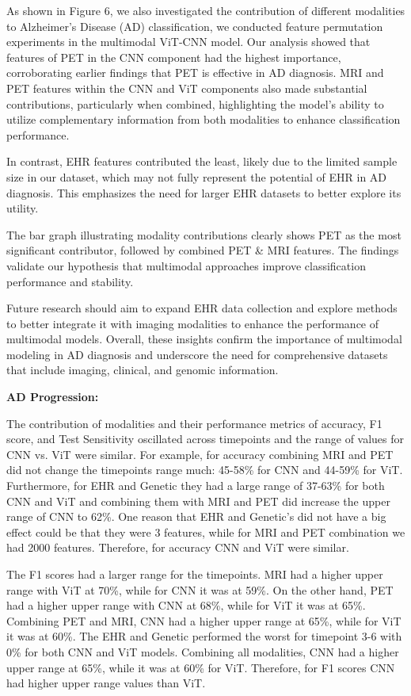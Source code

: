 As shown in Figure 6, we also investigated the contribution of different modalities to Alzheimer's Disease (AD) classification, we conducted feature permutation experiments in the multimodal ViT-CNN model. Our analysis showed that features of PET in the CNN component had the highest importance, corroborating earlier findings that PET is effective in AD diagnosis. MRI and PET features within the CNN and ViT components also made substantial contributions, particularly when combined, highlighting the model's ability to utilize complementary information from both modalities to enhance classification performance. 

In contrast, EHR features contributed the least, likely due to the limited sample size in our dataset, which may not fully represent the potential of EHR in AD diagnosis. This emphasizes the need for larger EHR datasets to better explore its utility. 

The bar graph illustrating modality contributions clearly shows PET as the most significant contributor, followed by combined PET \& MRI features. The findings validate our hypothesis that multimodal approaches improve classification performance and stability. 

Future research should aim to expand EHR data collection and explore methods to better integrate it with imaging modalities to enhance the performance of multimodal models. Overall, these insights confirm the importance of multimodal modeling in AD diagnosis and underscore the need for comprehensive datasets that include imaging, clinical, and genomic information. 

\textbf{AD Progression: }

The contribution of modalities and their performance metrics of accuracy, F1 score, and Test Sensitivity oscillated across timepoints and the range of values for CNN vs. ViT were similar. For example, for accuracy combining MRI and PET did not change the timepoints range much:  45-58\% for CNN and 44-59\% for ViT. Furthermore, for EHR and Genetic they had a large range of 37-63\% for both CNN and ViT and combining them with MRI and PET did increase the upper range of CNN to 62\%. One reason that EHR and Genetic’s did not have a big effect could be that they were 3 features, while for MRI and PET combination we had 2000 features. Therefore, for accuracy CNN and ViT were similar.  

The F1 scores had a larger range for the timepoints. MRI had a higher upper range with ViT at 70\%, while for CNN it was at 59\%. On the other hand, PET had a higher upper range with CNN at 68\%, while for ViT it was at 65\%. Combining PET and MRI, CNN had a higher upper range at 65\%, while for ViT it was at 60\%. The EHR and Genetic performed the worst for timepoint 3-6 with 0\% for both CNN and ViT models.  Combining all modalities, CNN had a higher upper range at 65\%, while it was at 60\% for ViT. Therefore, for F1 scores CNN had higher upper range values than ViT. 


